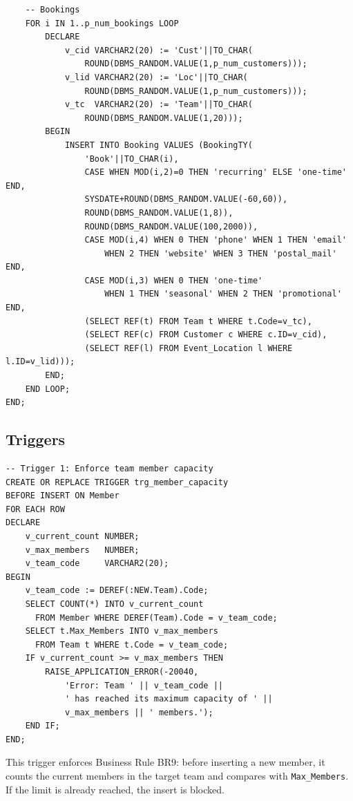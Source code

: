 \begin{lstlisting}
    -- Bookings
    FOR i IN 1..p_num_bookings LOOP
        DECLARE
            v_cid VARCHAR2(20) := 'Cust'||TO_CHAR(
                ROUND(DBMS_RANDOM.VALUE(1,p_num_customers)));
            v_lid VARCHAR2(20) := 'Loc'||TO_CHAR(
                ROUND(DBMS_RANDOM.VALUE(1,p_num_customers)));
            v_tc  VARCHAR2(20) := 'Team'||TO_CHAR(
                ROUND(DBMS_RANDOM.VALUE(1,20)));
        BEGIN
            INSERT INTO Booking VALUES (BookingTY(
                'Book'||TO_CHAR(i),
                CASE WHEN MOD(i,2)=0 THEN 'recurring' ELSE 'one-time' END,
                SYSDATE+ROUND(DBMS_RANDOM.VALUE(-60,60)),
                ROUND(DBMS_RANDOM.VALUE(1,8)),
                ROUND(DBMS_RANDOM.VALUE(100,2000)),
                CASE MOD(i,4) WHEN 0 THEN 'phone' WHEN 1 THEN 'email'
                    WHEN 2 THEN 'website' WHEN 3 THEN 'postal_mail' END,
                CASE MOD(i,3) WHEN 0 THEN 'one-time'
                    WHEN 1 THEN 'seasonal' WHEN 2 THEN 'promotional' END,
                (SELECT REF(t) FROM Team t WHERE t.Code=v_tc),
                (SELECT REF(c) FROM Customer c WHERE c.ID=v_cid),
                (SELECT REF(l) FROM Event_Location l WHERE l.ID=v_lid)));
        END;
    END LOOP;
END;
\end{lstlisting}

\subsection{Triggers}

\begin{lstlisting}
-- Trigger 1: Enforce team member capacity
CREATE OR REPLACE TRIGGER trg_member_capacity
BEFORE INSERT ON Member
FOR EACH ROW
DECLARE
    v_current_count NUMBER;
    v_max_members   NUMBER;
    v_team_code     VARCHAR2(20);
BEGIN
    v_team_code := DEREF(:NEW.Team).Code;
    SELECT COUNT(*) INTO v_current_count
      FROM Member WHERE DEREF(Team).Code = v_team_code;
    SELECT t.Max_Members INTO v_max_members
      FROM Team t WHERE t.Code = v_team_code;
    IF v_current_count >= v_max_members THEN
        RAISE_APPLICATION_ERROR(-20040,
            'Error: Team ' || v_team_code ||
            ' has reached its maximum capacity of ' ||
            v_max_members || ' members.');
    END IF;
END;
\end{lstlisting}

This trigger enforces Business Rule BR9: before inserting a new member, it counts the current members
in the target team and compares with \texttt{Max\_Members}. If the limit is already reached, the insert is blocked.

